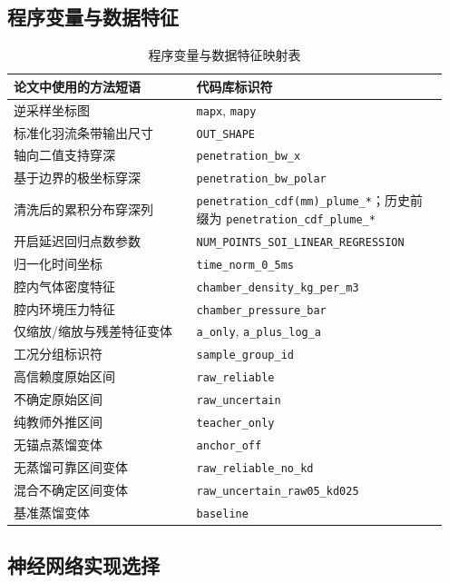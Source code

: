 \subsection{程序变量与数据特征}

\begin{table}[h]
\centering
\footnotesize
\begin{tabular}{p{0.4\linewidth} p{0.55\linewidth}}
\toprule
\textbf{论文中使用的方法短语} & \textbf{代码库标识符} \\
\midrule
逆采样坐标图 & \texttt{mapx}, \texttt{mapy} \\
标准化羽流条带输出尺寸 & \texttt{OUT\_SHAPE} \\
轴向二值支持穿深 & \texttt{penetration\_bw\_x} \\
基于边界的极坐标穿深 & \texttt{penetration\_bw\_polar} \\
清洗后的累积分布穿深列 & \texttt{penetration\_cdf(mm)\_plume\_*}；历史前缀为 \texttt{penetration\_cdf\_plume\_*} \\
开启延迟回归点数参数 & \texttt{NUM\_POINTS\_SOI\_LINEAR\_REGRESSION} \\
归一化时间坐标 & \texttt{time\_norm\_0\_5ms} \\
腔内气体密度特征 & \texttt{chamber\_density\_kg\_per\_m3} \\
腔内环境压力特征 & \texttt{chamber\_pressure\_bar} \\
仅缩放/缩放与残差特征变体 & \texttt{a\_only}, \texttt{a\_plus\_log\_a} \\
工况分组标识符 & \texttt{sample\_group\_id} \\
高信赖度原始区间 & \texttt{raw\_reliable} \\
不确定原始区间 & \texttt{raw\_uncertain} \\
纯教师外推区间 & \texttt{teacher\_only} \\
无锚点蒸馏变体 & \texttt{anchor\_off} \\
无蒸馏可靠区间变体 & \texttt{raw\_reliable\_no\_kd} \\
混合不确定区间变体 & \texttt{raw\_uncertain\_raw05\_kd025} \\
基准蒸馏变体 & \texttt{baseline} \\
\bottomrule
\end{tabular}
\caption{程序变量与数据特征映射表}
\end{table}
\FloatBarrier

\subsection{神经网络实现选择}
\label{app:nn-implementation-mapping}

